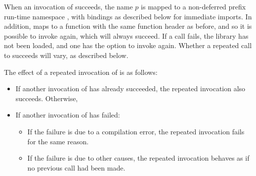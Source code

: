 \documentclass[makeidx]{article}
\begin{document}

\LMHash{}%
When an invocation of  succeeds,
the name $p$ is mapped to a non-deferred prefix run-time namespace
,
with bindings as described below for immediate imports.
In addition, 
maps  to a function with
the same function header as before,
and so it is possible to invoke  again,
which will always succeed.
If a call fails, the library has not been loaded,
and one has the option to invoke  again.
Whether a repeated call to  succeeds will vary,
as described below.


\LMHash{}%
The effect of a repeated invocation of  is as follows:
\begin{itemize}
\item
  If another invocation of  has already succeeded,
  the repeated invocation also succeeds.
  Otherwise,
\item
  If another invocation of  has failed:
  \begin{itemize}
  \item
    If the failure is due to a compilation error,
    the repeated invocation fails for the same reason.
  \item
    If the failure is due to other causes,
    the repeated invocation behaves as if no previous call had been made.
  \end{itemize}
\end{itemize}

\EndCase
\end{document}
